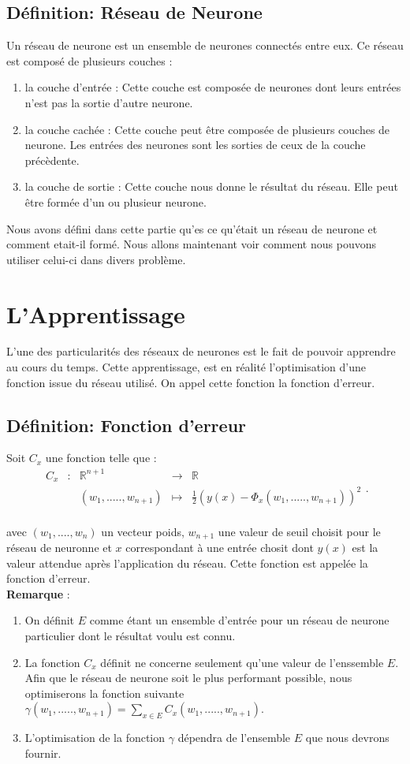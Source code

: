 \documentclass{article}
\newcommand{\fonction}[5]{
	\begin{array}{ccccc}
#1 & : & #2 & \to & #3\\
	& & #4 & \mapsto & #5\\ 
	\end{array}
}
\begin{document}
	\subsection{Définition: Réseau de Neurone}
 	Un réseau de neurone est un ensemble de neurones connectés entre eux. Ce réseau est composé de plusieurs couches : 
	\begin{enumerate}	
		\item la couche d'entrée : Cette couche est composée de neurones dont leurs entrées n'est pas la sortie d'autre neurone. 
		\item la couche cachée : Cette couche peut être composée de plusieurs couches de neurone. Les entrées des neurones sont les sorties de ceux de la couche précèdente.
		\item la couche de sortie : Cette couche nous donne le résultat du réseau. Elle peut être formée d'un ou plusieur neurone.
	\end{enumerate}		

		
	Nous avons défini dans cette partie qu'es ce qu'était un réseau de neurone et comment etait-il formé. Nous allons maintenant voir comment nous pouvons utiliser celui-ci dans divers problème. %
	
	
\section{L'Apprentissage}	
L'une des particularités des réseaux de neurones est le fait de pouvoir apprendre au cours du temps. Cette apprentissage, est en réalité l'optimisation d'une fonction issue du réseau utilisé. On appel cette fonction la fonction d'erreur. \\
 
	\subsection{Définition: Fonction d'erreur}
		Soit $C_{x}$ une fonction telle que :	
		  \[ \fonction{C_{x}}{\mathbb{R}^{n+1}}{\mathbb{R}}{(w_1,.....,w_{n+1})}{\frac{1}{2}(y(x)-\Phi_{x}(w_1,.....,w_{n+1}))^{2}}. \]

		avec $(w_1,....,w_n)$ un vecteur poids, $w_{n+1}$ une valeur de seuil choisit pour le réseau de neuronne et $x$ correspondant à une entrée chosit dont $y(x)$ est la valeur attendue après l'application du réseau. Cette fonction est appelée la fonction d'erreur. \\


 \textbf{Remarque }: 
	\begin{enumerate} %
		\item On définit $E$ comme étant un ensemble d'entrée pour un réseau de neurone particulier dont le résultat voulu est connu. 
		\item La fonction $C_{x}$ définit ne concerne seulement qu'une valeur de l'enssemble $E$. Afin que le réseau de neurone soit le plus performant possible, nous optimiserons la fonction suivante $\gamma(w_1,.....,w_{n+1}) = \sum_{x \in E} C_{x}(w_1,.....,w_{n+1})$.
		\item L'optimisation de la fonction $\gamma$ dépendra de l'ensemble $E$ que nous devrons fournir. 
	\end{enumerate}
\end{document}
